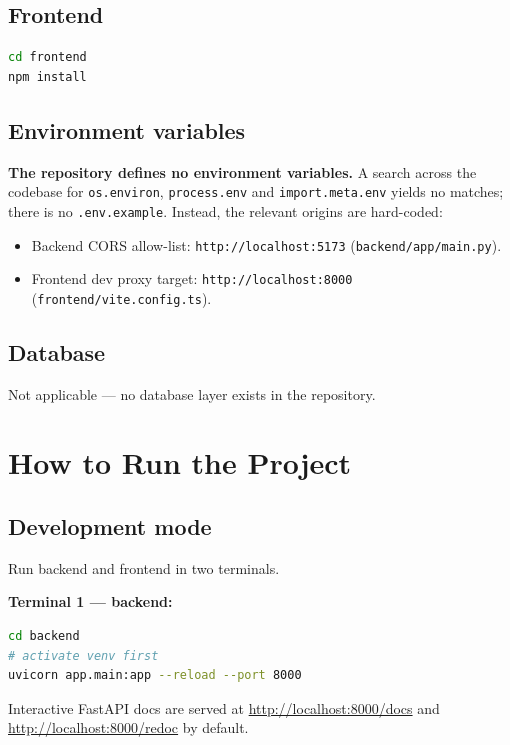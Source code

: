 \documentclass[11pt,a4paper]{article}
\begin{document}
\subsection{Frontend}
\begin{lstlisting}[language=bash]
cd frontend
npm install
\end{lstlisting}

\subsection{Environment variables}
\textbf{The repository defines no environment variables.} A search across the
codebase for \texttt{os.environ}, \texttt{process.env} and
\texttt{import.meta.env} yields no matches; there is no \texttt{.env.example}.
Instead, the relevant origins are hard-coded:

\begin{itemize}[leftmargin=1.2em]
  \item Backend CORS allow-list: \texttt{http://localhost:5173}
        (\texttt{backend/app/main.py}).
  \item Frontend dev proxy target: \texttt{http://localhost:8000}
        (\texttt{frontend/vite.config.ts}).
\end{itemize}

\subsection{Database}
Not applicable --- no database layer exists in the repository.

\section{How to Run the Project}
\label{sec:run}

\subsection{Development mode}
Run backend and frontend in two terminals.

\textbf{Terminal 1 --- backend:}
\begin{lstlisting}[language=bash]
cd backend
# activate venv first
uvicorn app.main:app --reload --port 8000
\end{lstlisting}

Interactive FastAPI docs are served at \url{http://localhost:8000/docs} and
\url{http://localhost:8000/redoc} by default.
\end{document}
